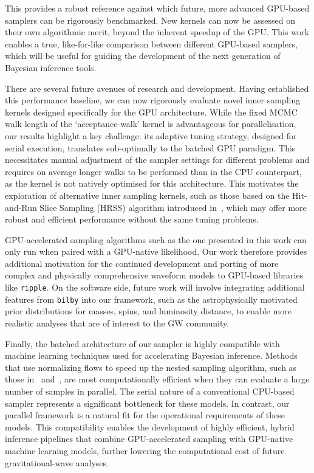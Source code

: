 \documentclass[fleqn,usenatbib]{mnras}
\begin{document}
This provides a robust reference against which future, more advanced
GPU-based samplers can be rigorously benchmarked. New kernels can now be 
assessed on their own algorithmic merit, beyond
the inherent speedup of the GPU. This work enables a true,
like-for-like comparison between different GPU-based samplers, 
which will be useful for guiding the development
of the next generation of Bayesian inference tools.

There are several future avenues of research and development. 
Having established this performance baseline, we can now rigorously
evaluate novel inner sampling kernels designed specifically for the GPU
architecture. While the fixed MCMC walk length of the `acceptance-walk'
kernel is advantageous for parallelisation, our results highlight a key
challenge: its adaptive tuning strategy, designed for serial execution,
translates sub-optimally to the batched GPU paradigm. This necessitates
manual adjustment of the sampler settings for different problems and
requires on average longer walks to be performed than in the CPU counterpart,
as the kernel is not natively optimised for this
architecture. This motivates the exploration of alternative inner
sampling kernels, such as those based on the Hit-and-Run Slice Sampling
(HRSS) algorithm introduced in~\cite{yallup2025nested}, which may offer
more robust and efficient performance without the same tuning problems.

GPU-accelerated sampling algorithms such as the one presented in this work can only run when
paired with a GPU-native likelihood. Our work therefore provides additional motivation for the continued development
and porting of more complex and physically comprehensive waveform models
to GPU-based libraries like \texttt{ripple}. On the software side, future
work will involve integrating additional features from \texttt{bilby}
into our framework, such as the astrophysically motivated prior
distributions for masses, spins, and luminosity distance, to enable 
more realistic analyses that are of interest to the GW community.

Finally, the batched architecture of our sampler is highly compatible
with machine learning techniques used for accelerating Bayesian
inference. Methods that use normalizing flows to speed up
the nested sampling algorithm, such as those in~\cite{Williams2021Nessai} and~\cite{Prathaban}, are most
computationally efficient when they can evaluate a large number of
samples in parallel. The serial nature of a conventional CPU-based
sampler represents a significant bottleneck for these models. In
contrast, our parallel framework is a natural fit for the operational 
requirements of these models. This compatibility enables the development of highly efficient,
hybrid inference pipelines that combine GPU-accelerated sampling with
GPU-native machine learning models, further lowering the computational
cost of future gravitational-wave analyses.
\end{document}
